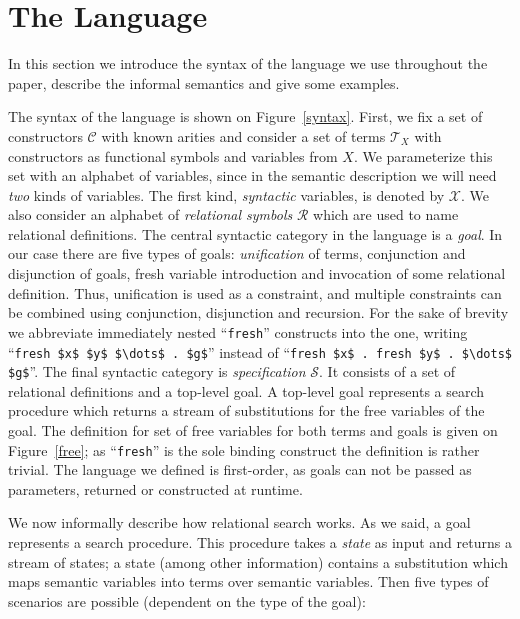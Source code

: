 \section{The Language}
\label{language}

In this section we introduce the syntax of the language we use throughout the paper, describe the informal semantics and give some examples.

The syntax of the language is shown on Figure~\ref{syntax}. First, we fix a set of constructors $\mathcal{C}$ with known arities and consider
a set of terms $\mathcal{T}_X$ with constructors as functional symbols and variables from $X$. We parameterize this set with an alphabet of
variables, since in the semantic description we will need \emph{two} kinds of variables. The first kind, \emph{syntactic} variables, is denoted
by $\mathcal{X}$. We also consider an alphabet of \emph{relational symbols} $\mathcal{R}$ which are used to name relational definitions.
The central syntactic category in the language is a \emph{goal}. In our case there are five types of goals: \emph{unification} of terms,
conjunction and disjunction of goals, fresh variable introduction and invocation of some relational definition. Thus, unification is used
as a constraint, and multiple constraints can be combined using conjunction, disjunction and recursion. For the sake of brevity we
abbreviate immediately nested ``\lstinline|fresh|'' constructs into the one, writing ``\lstinline|fresh $x$ $y$ $\dots$ . $g$|'' instead of
``\lstinline|fresh $x$ . fresh $y$ . $\dots$ $g$|''. The final syntactic category is \emph{specification} $\mathcal{S}$. It consists of a set
of relational definitions and a top-level goal. A top-level goal represents a search procedure which returns a stream of substitutions for
the free variables of the goal. The definition for set of free variables for both terms and goals is given on Figure~\ref{free}; as ``\lstinline|fresh|''
is the sole binding construct the definition is rather trivial. The language we defined is first-order, as goals can not be passed as parameters,
returned or constructed at runtime.

We now informally describe how relational search works. As we said, a goal represents a search procedure. This procedure takes a \emph{state} as input and returns a
stream of states; a state (among other information) contains a substitution which maps semantic variables into terms over semantic variables. Then five types of
scenarios are possible (dependent on the type of the goal):

